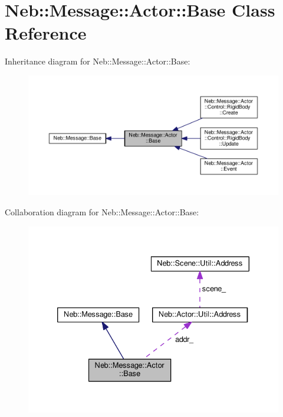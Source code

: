 \hypertarget{classNeb_1_1Message_1_1Actor_1_1Base}{\section{Neb\-:\-:Message\-:\-:Actor\-:\-:Base Class Reference}
\label{classNeb_1_1Message_1_1Actor_1_1Base}
}


Inheritance diagram for Neb\-:\-:Message\-:\-:Actor\-:\-:Base\-:
\nopagebreak
\begin{figure}[H]
\begin{center}
\leavevmode
\includegraphics[width=350pt]{classNeb_1_1Message_1_1Actor_1_1Base__inherit__graph}
\end{center}
\end{figure}


Collaboration diagram for Neb\-:\-:Message\-:\-:Actor\-:\-:Base\-:
\nopagebreak
\begin{figure}[H]
\begin{center}
\leavevmode
\includegraphics[width=335pt]{classNeb_1_1Message_1_1Actor_1_1Base__coll__graph}
\end{center}
\end{figure}
